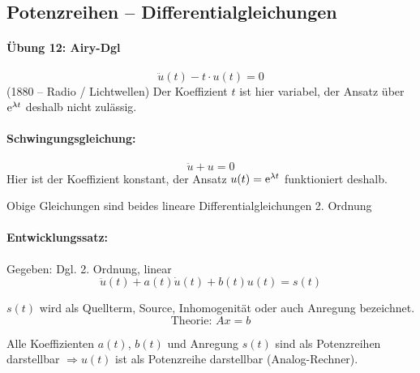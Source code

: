 
\subsection{Potenzreihen -- Differentialgleichungen}

\paragraph{Übung 12: Airy-Dgl}
\begin{equation*}
	\ddot{u}(t) - t \cdot u(t) = 0
\end{equation*}
(1880 -- Radio / Lichtwellen) Der Koeffizient $t$ ist hier variabel, der Ansatz über $\operatorname{e}^{\lambda t}$ deshalb nicht zulässig.

\paragraph{Schwingungsgleichung:}
\begin{equation*}
	\ddot{u} + u = 0
\end{equation*}
Hier ist der Koeffizient konstant, der Ansatz $u(t) = \operatorname{e}^{\lambda t}$ funktioniert deshalb.

Obige Gleichungen sind beides lineare Differentialgleichungen 2. Ordnung

\paragraph{Entwicklungssatz:}
Gegeben: Dgl. 2. Ordnung, linear
\begin{equation*}
	\ddot{u}(t) + a(t)\dot{u}(t) + b(t)u(t) = s(t)
\end{equation*}

$s(t)$ wird als Quellterm, Source, Inhomogenität oder auch Anregung bezeichnet.
\begin{equation*}
	\text{Theorie: }Ax = b
\end{equation*}

\begin{theorem}[Entwicklungssatz]
	Alle Koeffizienten $a(t)$, $b(t)$ und Anregung $s(t)$ sind als Potenzreihen darstellbar $\Rightarrow u(t)$ ist als Potenzreihe darstellbar (Analog-Rechner).
\end{theorem}

